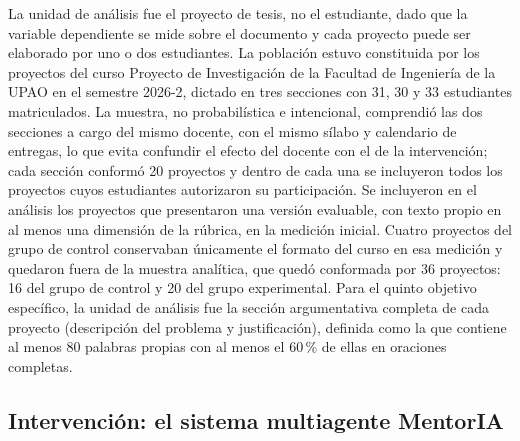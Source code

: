 \documentclass[journal]{IEEEtran}
\begin{document}
La unidad de análisis fue el proyecto de tesis, no el estudiante, dado que la variable dependiente se mide sobre el documento y cada proyecto puede ser elaborado por uno o dos estudiantes. La población estuvo constituida por los proyectos del curso Proyecto de Investigación de la Facultad de Ingeniería de la UPAO en el semestre 2026-2, dictado en tres secciones con 31, 30 y 33 estudiantes matriculados. La muestra, no probabilística e intencional, comprendió las dos secciones a cargo del mismo docente, con el mismo sílabo y calendario de entregas, lo que evita confundir el efecto del docente con el de la intervención; cada sección conformó 20 proyectos y dentro de cada una se incluyeron todos los proyectos cuyos estudiantes autorizaron su participación. Se incluyeron en el análisis los proyectos que presentaron una versión evaluable, con texto propio en al menos una dimensión de la rúbrica, en la medición inicial. Cuatro proyectos del grupo de control conservaban únicamente el formato del curso en esa medición y quedaron fuera de la muestra analítica, que quedó conformada por 36 proyectos: 16 del grupo de control y 20 del grupo experimental. Para el quinto objetivo específico, la unidad de análisis fue la sección argumentativa completa de cada proyecto (descripción del problema y justificación), definida como la que contiene al menos 80 palabras propias con al menos el 60\,\% de ellas en oraciones completas.

\subsection{Intervención: el sistema multiagente MentorIA}
\end{document}
